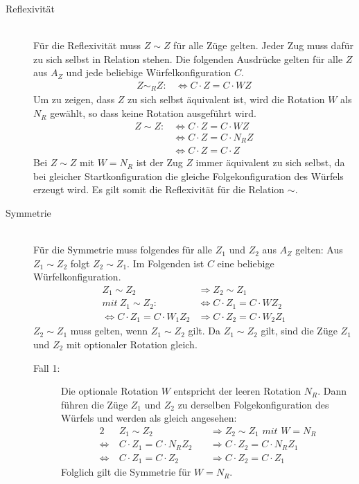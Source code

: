 \documentclass[12pt,a4paper, usenames, dvipsnames]{article}
\theoremstyle{mystyle}
\theoremstyle{definition}
\begin{document}
\begin{description}


\item [Reflexivität] \ \\
Für die Reflexivität muss $Z \sim Z$ für alle Züge gelten. Jeder Zug muss dafür zu sich selbst in Relation stehen. Die folgenden Ausdrücke gelten für alle $Z$ aus $A_Z$ und jede beliebige Würfelkonfiguration $C$.
\begin{align*}
Z \sim_R Z : & \Leftrightarrow C \cdot Z = C \cdot WZ
\end{align*}
Um zu zeigen, dass $Z$ zu sich selbst äquivalent ist, wird die Rotation $W$ als $N_R$ gewählt, so dass keine Rotation ausgeführt wird.
\begin{align*}
Z \sim Z : & \Leftrightarrow  C \cdot Z = C \cdot WZ \\
\ & \Leftrightarrow C \cdot Z=C \cdot N_R Z \\
\ & \Leftrightarrow C \cdot Z = C \cdot Z
\end{align*}
Bei $Z \sim Z$ mit $W=N_R$ ist der Zug $Z$ immer äquivalent zu sich selbst, da bei gleicher Startkonfiguration die gleiche Folgekonfiguration des Würfels erzeugt wird. Es gilt somit die Reflexivität für die Relation $\sim$.

\item [Symmetrie] \ \\
Für die Symmetrie muss folgendes für alle $Z_1$ und $Z_2$ aus $A_Z$ gelten: Aus $Z_1 \sim Z_2$ folgt $Z_2 \sim Z_1$.  Im Folgenden ist $C$ eine beliebige Würfelkonfiguration.
\begin{align*}
Z_1 \sim Z_2 & \Rightarrow Z_2 \sim Z_1 \\
mit \ Z_1 \sim Z_2 : & \Leftrightarrow  C \cdot  Z_1 = C \cdot  WZ_2 \\
\Leftrightarrow C \cdot  Z_1 = C \cdot  W_1 Z_2 & \Rightarrow C \cdot  Z_2 = C \cdot  W_2 Z_1
\end{align*}
$Z_2 \sim Z_1$ muss gelten, wenn $Z_1 \sim Z_2$ gilt. Da $Z_1 \sim Z_2$ gilt, sind die Züge $Z_1$ und $Z_2$ mit optionaler Rotation gleich. 
\begin{description}

\item[Fall 1:] 
Die optionale Rotation $W$ entspricht der leeren Rotation $N_R$. Dann führen die Züge $Z_1$ und $Z_2$ zu derselben Folgekonfiguration des Würfels und werden als gleich angesehen:
\begin{alignat*}{2}
& Z_1 \sim Z_2 && \Rightarrow Z_2 \sim Z_1 \textit{ mit }  W = N_R \\ 
\Leftrightarrow \  & C \cdot  Z_1 = C \cdot  N_R Z_2 \ && \Rightarrow C \cdot  Z_2 = C \cdot  N_R Z_1 \\
\Leftrightarrow \  & C \cdot  Z_1 = C \cdot  Z_2 && \Rightarrow C \cdot  Z_2 = C \cdot  Z_1 
\end{alignat*}
Folglich gilt die Symmetrie für $W = N_R$.


\end{description}
\end{description}
\end{document}

